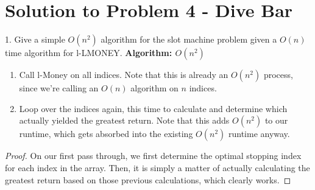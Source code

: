 \documentclass[11pt]{article}
\begin{document}
\newpage

\section*{Solution to Problem 4 - Dive Bar}
1. Give a simple $O(n^2)$ algorithm for the slot machine problem given a $O(n)$ time algorithm for l-LMONEY.
\textbf{Algorithm: $O(n^2)$}
\begin{enumerate}
\item Call l-Money on all indices. Note that this is already an $O(n^2)$ process, since we're calling an $O(n)$ algorithm on $n$ indices.
\item Loop over the indices again, this time to calculate and determine  which actually yielded the greatest return. Note that this adds $O(n^2)$ to our runtime, which gets absorbed into the existing $O(n^2)$ runtime anyway.
\end{enumerate}
\begin{proof}
On our first pass through, we first determine the optimal stopping index for each index in the array. Then, it is simply a matter of actually calculating the greatest return based on those previous calculations, which clearly works.
\end{proof}
\end{document}
